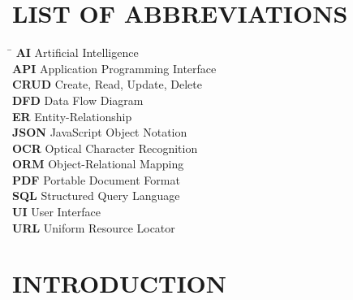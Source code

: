 \documentclass[12pt]{report}
\begin{document}
\newpage
\vspace*{-1.5cm}
\listoftables

\newpage
\chapter*{LIST OF ABBREVIATIONS}

\begin{tabbing}
\hspace{3cm} \= \kill
\textbf{AI} \> Artificial Intelligence \\
\textbf{API} \> Application Programming Interface \\
\textbf{CRUD} \> Create, Read, Update, Delete \\
\textbf{DFD} \> Data Flow Diagram \\
\textbf{ER} \> Entity-Relationship \\
\textbf{JSON} \> JavaScript Object Notation \\
\textbf{OCR} \> Optical Character Recognition \\
\textbf{ORM} \> Object-Relational Mapping \\
\textbf{PDF} \> Portable Document Format \\
\textbf{SQL} \> Structured Query Language \\
\textbf{UI} \> User Interface \\
\textbf{URL} \> Uniform Resource Locator \\
\end{tabbing}

\newpage
{}
\setcounter{page}{1}

\chapter{INTRODUCTION}
\end{document}
